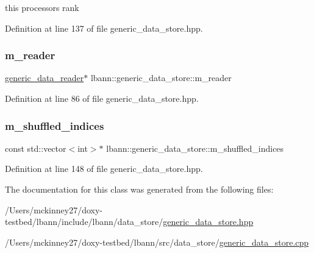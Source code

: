 this processor\textquotesingle{}s rank 



Definition at line 137 of file generic\+\_\+data\+\_\+store.\+hpp.

\mbox{\label{classlbann_1_1generic__data__store_afa49ced0ab64c632371ea52532a91ec2}} 
\subsubsection{\texorpdfstring{m\+\_\+reader}{m\_reader}}
{\footnotesize\ttfamily \hyperlink{classlbann_1_1generic__data__reader}{generic\+\_\+data\+\_\+reader}$\ast$ lbann\+::generic\+\_\+data\+\_\+store\+::m\+\_\+reader\hspace{0.3cm}{\ttfamily [protected]}}



Definition at line 86 of file generic\+\_\+data\+\_\+store.\+hpp.

\mbox{\label{classlbann_1_1generic__data__store_ad456f747ee07f63df15c60833dfb82ad}} 
\subsubsection{\texorpdfstring{m\+\_\+shuffled\+\_\+indices}{m\_shuffled\_indices}}
{\footnotesize\ttfamily const std\+::vector$<$int$>$$\ast$ lbann\+::generic\+\_\+data\+\_\+store\+::m\+\_\+shuffled\+\_\+indices\hspace{0.3cm}{\ttfamily [protected]}}



Definition at line 148 of file generic\+\_\+data\+\_\+store.\+hpp.



The documentation for this class was generated from the following files\+:\begin{DoxyCompactItemize}
\item 
/\+Users/mckinney27/doxy-\/testbed/lbann/include/lbann/data\+\_\+store/\hyperlink{generic__data__store_8hpp}{generic\+\_\+data\+\_\+store.\+hpp}\item 
/\+Users/mckinney27/doxy-\/testbed/lbann/src/data\+\_\+store/\hyperlink{generic__data__store_8cpp}{generic\+\_\+data\+\_\+store.\+cpp}\end{DoxyCompactItemize}
